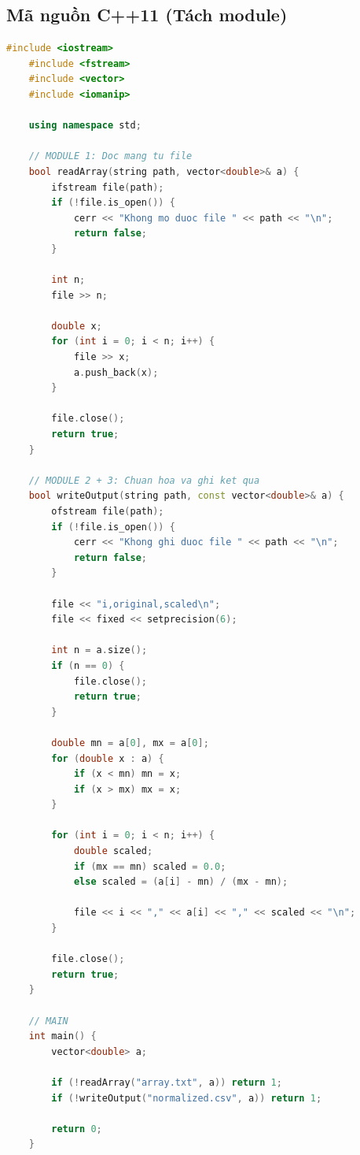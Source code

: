 \subsection{Mã nguồn C++11 (Tách module)}
\begin{lstlisting}[language=C++, breaklines=true]
    #include <iostream>
    #include <fstream>
    #include <vector>
    #include <iomanip>

    using namespace std;

    // MODULE 1: Doc mang tu file
    bool readArray(string path, vector<double>& a) {
        ifstream file(path);
        if (!file.is_open()) {
            cerr << "Khong mo duoc file " << path << "\n";
            return false;
        }

        int n;
        file >> n;

        double x;
        for (int i = 0; i < n; i++) {
            file >> x;
            a.push_back(x);
        }

        file.close();
        return true;
    }

    // MODULE 2 + 3: Chuan hoa va ghi ket qua
    bool writeOutput(string path, const vector<double>& a) {
        ofstream file(path);
        if (!file.is_open()) {
            cerr << "Khong ghi duoc file " << path << "\n";
            return false;
        }

        file << "i,original,scaled\n";
        file << fixed << setprecision(6);

        int n = a.size();
        if (n == 0) {
            file.close();
            return true;
        }

        double mn = a[0], mx = a[0];
        for (double x : a) {
            if (x < mn) mn = x;
            if (x > mx) mx = x;
        }

        for (int i = 0; i < n; i++) {
            double scaled;
            if (mx == mn) scaled = 0.0;
            else scaled = (a[i] - mn) / (mx - mn);

            file << i << "," << a[i] << "," << scaled << "\n";
        }

        file.close();
        return true;
    }

    // MAIN
    int main() {
        vector<double> a;

        if (!readArray("array.txt", a)) return 1;
        if (!writeOutput("normalized.csv", a)) return 1;

        return 0;
    }
\end{lstlisting}

